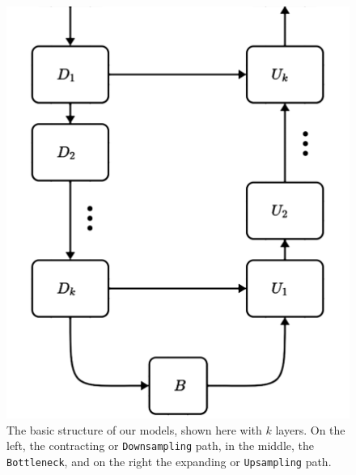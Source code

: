 \documentclass[11pt]{article}
\begin{document}
\begin{multicols}{2}
      \begin{figure}[H]
            \centering
            \includegraphics[width=0.7\linewidth]{model-structure.png}
            \caption{The basic structure of our models, shown here with $k$ layers. On the left, the contracting or \texttt{Downsampling} path, in the middle, the \texttt{Bottleneck}, and on the right the expanding or \texttt{Upsampling} path.}
            \label{fig:model_structure}
      \end{figure}


\end{multicols}
\end{document}
